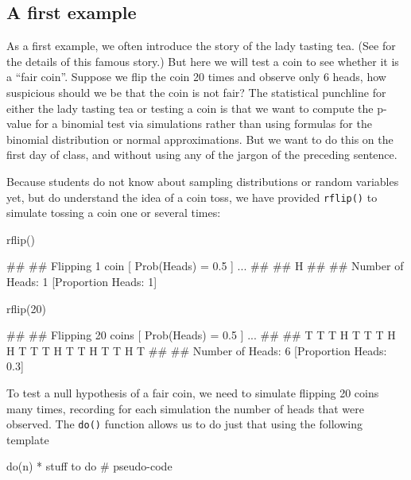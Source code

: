 \subsection{A first example}\label{a-first-example}

As a first example, we often introduce the story of the lady tasting
tea. (See \cite{Salsburg:2002} for the details of this famous story.)
But here we will test a coin to see whether it is a ``fair coin''.
Suppose we flip the coin 20 times and observe only 6 heads, how
suspicious should we be that the coin is not fair? The statistical
punchline for either the lady tasting tea or testing a coin is that we
want to compute the p-value for a binomial test via simulations rather
than using formulas for the binomial distribution or normal
approximations. But we want to do this on the first day of class, and
without using any of the jargon of the preceding sentence.

Because students do not know about sampling distributions or random
variables yet, but do understand the idea of a coin toss, we have
provided \texttt{rflip()} to simulate tossing a coin one or several
times:

\begin{Schunk}
\begin{Sinput}
rflip()
\end{Sinput}
\begin{Soutput}
## 
## Flipping 1 coin [ Prob(Heads) = 0.5 ] ...
## 
## H
## 
## Number of Heads: 1 [Proportion Heads: 1]
\end{Soutput}
\begin{Sinput}
rflip(20)
\end{Sinput}
\begin{Soutput}
## 
## Flipping 20 coins [ Prob(Heads) = 0.5 ] ...
## 
## T T T H T T T H H T T T H T T H T T H T
## 
## Number of Heads: 6 [Proportion Heads: 0.3]
\end{Soutput}
\end{Schunk}

To test a null hypothesis of a fair coin, we need to simulate flipping
20 coins many times, recording for each simulation the number of heads
that were observed. The \texttt{do()} function allows us to do just that
using the following template

\begin{Schunk}
\begin{Sinput}
do(n) * {stuff to do}             # pseudo-code
\end{Sinput}
\end{Schunk}

